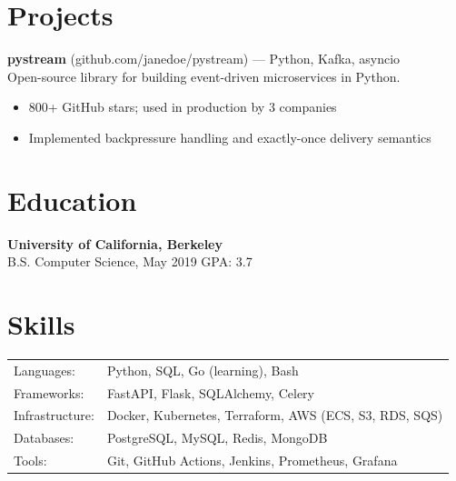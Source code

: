\documentclass[10.5pt,letterpaper]{article}
\begin{document}
\section*{Projects}

\textbf{pystream} (github.com/janedoe/pystream) --- Python, Kafka, asyncio\\
Open-source library for building event-driven microservices in Python.
\begin{itemize}
  \item 800+ GitHub stars; used in production by 3 companies
  \item Implemented backpressure handling and exactly-once delivery semantics
\end{itemize}

\section*{Education}

\textbf{University of California, Berkeley}\\
B.S. Computer Science, May 2019 \hfill GPA: 3.7

\section*{Skills}

\begin{tabular}{ll}
  Languages: & Python, SQL, Go (learning), Bash \\
  Frameworks: & FastAPI, Flask, SQLAlchemy, Celery \\
  Infrastructure: & Docker, Kubernetes, Terraform, AWS (ECS, S3, RDS, SQS) \\
  Databases: & PostgreSQL, MySQL, Redis, MongoDB \\
  Tools: & Git, GitHub Actions, Jenkins, Prometheus, Grafana \\
\end{tabular}
\end{document}
